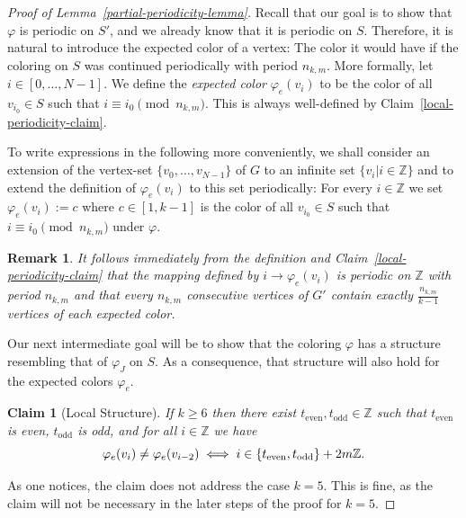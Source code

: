 \documentclass[a4paper,10pt,hidelinks]{amsart}
\renewcommand{\phi}{\ensuremath{\varphi}}
\newtheorem{claim}[theorem]{Claim}
\newtheorem{remark}[theorem]{Remark}
\theoremstyle{definition}
\begin{document}
\begin{proof}[Proof of Lemma~\ref{partial-periodicity-lemma}]
    Recall that our goal is to show that $\varphi$ is periodic on $S'$, and we already know that it is periodic on $S$. Therefore, it is natural to introduce the expected color of a vertex: The color it would have if the coloring on $S$ was continued periodically with period $n_{k,m}$. More formally, let $i \in [0,\ldots,N-1]$. We define the \emph{expected color} $\varphi_e(v_i)$ to be the color of all $v_{i_0} \in S$ such that $i \equiv i_0 \pmod{n_{k,m}}$. This is always well-defined by Claim~\ref{local-periodicity-claim}. 
    
    To write expressions in the following more conveniently, we shall consider an extension of the vertex-set $\{v_0,\ldots,v_{N-1}\}$ of $G$ to an infinite set $\{v_i|i\in\mathbb{Z}\}$ and to extend the definition of $\phi_e(v_i)$ to this set periodically: For every $i\in \mathbb{Z}$ we set $\phi_e(v_i):=c$ where $c\in [1,k-1]$ is the color of all $v_{i_0} \in S$ such that $i \equiv i_0 \pmod{n_{k,m}}$ under $\phi$.

    \begin{remark}\label{local-periodicity-rem}
        It follows immediately from the definition and Claim~\ref{local-periodicity-claim} that the mapping defined by $i\rightarrow \phi_e(v_i)$ is periodic on $\mathbb{Z}$ with period $n_{k,m}$ and that every $n_{k,m}$ consecutive vertices of $G'$ contain exactly $\frac{n_{k,m}}{k-1}$ vertices of each expected color.
    \end{remark}

    Our next intermediate goal will be to show that the coloring $\varphi$ has a structure resembling that of $\varphi_J$ on $S$. As a consequence, that structure will also hold for the expected colors $\varphi_e$. 

    \begin{claim}[Local Structure]\label{structure-claim}
        If $k \geq 6$ then there exist $t_{\text{even}}, t_{\text{odd}} \in \mathbb{Z}$ such that $t_{\text{even}}$ is even, $t_{\text{odd}}$ is odd, and for all $i \in \mathbb{Z}$ we have 
        \begin{equation}\notag
        \varphi_e(v_i) \neq \varphi_e(v_{i - 2}) \iff i \in \{t_{\text{even}}, t_{\text{odd}}\} + 2m\mathbb{Z}.
        \end{equation} 
    \end{claim} 
    As one notices, the claim does not address the case $k=5$. This is fine, as the claim will not be necessary in the later steps of the proof for $k=5$.
    

\end{proof}
\end{document}
